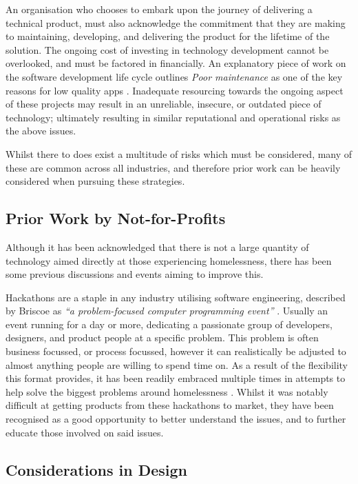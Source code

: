 An organisation who chooses to embark upon the journey of delivering a technical product, must also acknowledge the commitment that they are making to maintaining, developing, and delivering the product for the lifetime of the solution. The ongoing cost of investing in technology development cannot be overlooked, and must be factored in financially. An explanatory piece of work on the software development life cycle outlines \emph{Poor maintenance} as one of the key reasons for low quality apps \cite{inukollu2014factors}. Inadequate resourcing towards the ongoing aspect of these projects may result in an unreliable, insecure, or outdated piece of technology; ultimately resulting in similar reputational and operational risks as the above issues. 

Whilst there to does exist a multitude of risks which must be considered, many of these are common across all industries, and therefore prior work can be heavily considered when pursuing these strategies.

\subsection{Prior Work by Not-for-Profits}

Although it has been acknowledged that there is not a large quantity of technology aimed directly at those experiencing homelessness, there has been some previous discussions and events aiming to improve this.

Hackathons are a staple in any industry utilising software engineering, described by Briscoe as \emph{“a problem-focused computer programming event”} \cite[p.~1]{briscoe2014digital}. Usually an event running for a day or more, dedicating a passionate group of developers, designers, and product people at a specific problem. This problem is often business focussed, or process focussed, however it can realistically be adjusted to almost anything people are willing to spend time on. As a result of the flexibility this format provides, it has been readily embraced multiple times in attempts to help solve the biggest problems around homelessness \cite{wilson2019beyond} \cite{linnell2014hack} \cite{pogavcar2016urban}. Whilst it was notably difficult at getting products from these hackathons to market, they have been recognised as a good opportunity to better understand the issues, and to further educate those involved on said issues.

\subsection{Considerations in Design}


